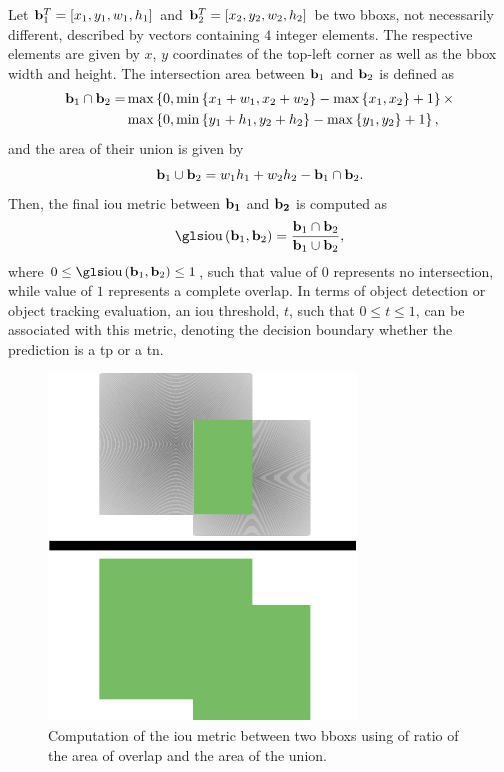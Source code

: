 Let ${\mathbf{b}}_{1}^{T} = \left[ {x_1, y_1, w_1, h_1} \right]$ and ${\mathbf{b}}_{2}^{T} = \left[ {x_2, y_2, w_2, h_2} \right]$ be two \glspl{bbox}, not necessarily different, described by vectors containing $4$ integer elements. The respective elements are given by $x$, $y$ coordinates of the top-left corner as well as the \gls{bbox} width and height. The intersection area between $\mathbf{b}_1$ and $\mathbf{b}_2$ is defined as
\begin{equation}
    \begin{aligned}
        \mathbf{b}_1 \cap \mathbf{b}_2 =
         & \max \left\{ {0,
            \min \left\{ {x_1 + w_1, x_2 + w_2} \right\} - \max \left\{ {x_1, x_2} \right\} + 1} \right\}
        \times                \\
         & \max \left\{ {0,
            \min \left\{ {y_1 + h_1, y_2 + h_2} \right\} - \max \left\{ {y_1, y_2} \right\} + 1} \right\},
    \end{aligned}
\end{equation}
and the area of their union is given by
\begin{equation}
    \mathbf{b}_1 \cup \mathbf{b}_2 = w_1 h_1 + w_2 h_2 - \mathbf{b}_1 \cap \mathbf{b}_2.
\end{equation}
Then, the final \gls{iou} metric between $\mathbf{b_1}$ and $\mathbf{b_2}$ is computed as
\begin{equation}
    \label{eq:IntersectionOverUnion}
    \func{\IOU}{\vect{b}_1, \vect{b}_2} =
    \frac{\vect{b}_1 \cap \vect{b}_2}{\vect{b}_1 \cup \vect{b}_2},
\end{equation}
where $0 \leq \func{\IOU}{\vect{b}_1, \vect{b}_2} \leq 1$, such that value of $0$ represents no intersection, while value of $1$ represents a complete overlap. In terms of object detection or object tracking evaluation, an \gls{iou} threshold, $t$, such that $0 \leq t \leq 1$, can be associated with this metric, denoting the decision boundary whether the prediction is a \gls{tp} or a \gls{tn}.

\begin{figure}[t]
    \centerline{\includegraphics[width=0.2\linewidth]{figures/theoretical_foundations/intersection_over_union.pdf}}
    \caption[\Gls{iou} visualization]{Computation of the \gls{iou} metric between two \glspl{bbox} using of ratio of the area of overlap and the area of the union.}
    \label{fig:IntersectionOverUnion}
\end{figure}

